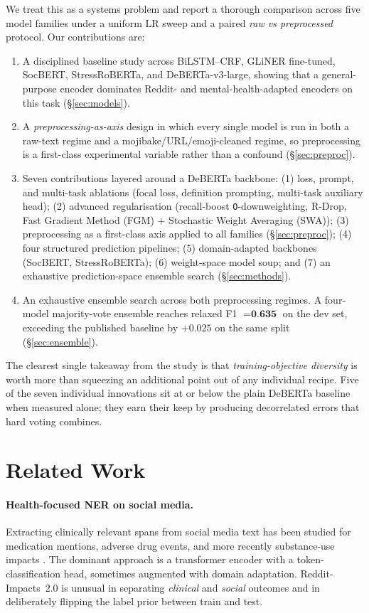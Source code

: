\documentclass[11pt]{article}
\begin{document}
We treat this as a systems problem and report a thorough comparison across
five model families under a uniform LR sweep and a paired \emph{raw vs preprocessed} protocol. Our contributions are:

\begin{enumerate}
\itemsep0em
\item A disciplined baseline study across BiLSTM--CRF, GLiNER
fine-tuned, SocBERT, StressRoBERTa, and DeBERTa-v3-large, showing that a
general-purpose encoder dominates Reddit- and mental-health-adapted
encoders on this task (\S\ref{sec:models}).
\item A \emph{preprocessing-as-axis} design in which every single model is
run in both a raw-text regime and a mojibake/URL/emoji-cleaned regime, so preprocessing is a first-class experimental variable rather than a
confound (\S\ref{sec:preproc}).
\item Seven contributions layered around a DeBERTa backbone:
(1) loss, prompt, and multi-task ablations (focal loss, definition
prompting, multi-task auxiliary head); (2) advanced regularisation
(recall-boost \texttt{O}-downweighting, R-Drop, Fast Gradient Method
(FGM) $+$ Stochastic Weight Averaging (SWA)); (3) preprocessing as a
first-class axis applied to all families (\S\ref{sec:preproc}); (4) four
structured prediction pipelines; (5) domain-adapted backbones (SocBERT,
StressRoBERTa); (6) weight-space model soup; and (7) an exhaustive
prediction-space ensemble search (\S\ref{sec:methods}).
\item An exhaustive ensemble search across both preprocessing regimes. A
four-model majority-vote ensemble reaches relaxed F1 $= \textbf{0.635}$ on
the dev set, exceeding the published baseline by $+0.025$ on the same
split (\S\ref{sec:ensemble}).
\end{enumerate}

The clearest single takeaway from the study is that \emph{training-objective diversity} is worth more than squeezing an additional point out of any
individual recipe. Five of the seven individual innovations sit at or
below the plain DeBERTa baseline when measured alone; they earn their
keep by producing decorrelated errors that hard voting combines.

\section{Related Work}
\label{sec:related}

\paragraph{Health-focused NER on social media.}
Extracting clinically relevant spans from social media text has been
studied for medication mentions, adverse drug events, and more recently
substance-use impacts \citep{sarker2019social,weissenbacher2022overview,
dey2025reddit}. The dominant approach is a transformer encoder with a
token-classification head, sometimes augmented with domain adaptation.
Reddit-Impacts~2.0 \citep{dey2025reddit} is unusual in separating \emph{clinical} and \emph{social} outcomes and in deliberately flipping the label prior between train and test.
\end{document}
